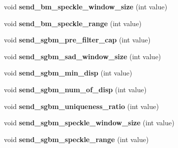 \begin{DoxyCompactItemize}
\item 
\hypertarget{classstereo_match_param_form_a77996c75fa4f772b5d4341acfdd50b09}{}void {\bfseries send\+\_\+bm\+\_\+speckle\+\_\+window\+\_\+size} (int value)\label{classstereo_match_param_form_a77996c75fa4f772b5d4341acfdd50b09}

\item 
\hypertarget{classstereo_match_param_form_a2b7c372cd0d9f42c25a44d5eaf99c2ff}{}void {\bfseries send\+\_\+bm\+\_\+speckle\+\_\+range} (int value)\label{classstereo_match_param_form_a2b7c372cd0d9f42c25a44d5eaf99c2ff}

\item 
\hypertarget{classstereo_match_param_form_acd316b30cc3066f8a32032b78ff283c7}{}void {\bfseries send\+\_\+sgbm\+\_\+pre\+\_\+filter\+\_\+cap} (int value)\label{classstereo_match_param_form_acd316b30cc3066f8a32032b78ff283c7}

\item 
\hypertarget{classstereo_match_param_form_a6492eca6d362722865ab44aaf2a155fd}{}void {\bfseries send\+\_\+sgbm\+\_\+sad\+\_\+window\+\_\+size} (int value)\label{classstereo_match_param_form_a6492eca6d362722865ab44aaf2a155fd}

\item 
\hypertarget{classstereo_match_param_form_a01a9c02e35a8e68a07fe04a13b575c14}{}void {\bfseries send\+\_\+sgbm\+\_\+min\+\_\+disp} (int value)\label{classstereo_match_param_form_a01a9c02e35a8e68a07fe04a13b575c14}

\item 
\hypertarget{classstereo_match_param_form_a15e280c258f60965a7e972e6a78f84b2}{}void {\bfseries send\+\_\+sgbm\+\_\+num\+\_\+of\+\_\+disp} (int value)\label{classstereo_match_param_form_a15e280c258f60965a7e972e6a78f84b2}

\item 
\hypertarget{classstereo_match_param_form_aed4704b886213a80bd808bc6fac40eb9}{}void {\bfseries send\+\_\+sgbm\+\_\+uniqueness\+\_\+ratio} (int value)\label{classstereo_match_param_form_aed4704b886213a80bd808bc6fac40eb9}

\item 
\hypertarget{classstereo_match_param_form_a0402267190761324594d9800c5463d41}{}void {\bfseries send\+\_\+sgbm\+\_\+speckle\+\_\+window\+\_\+size} (int value)\label{classstereo_match_param_form_a0402267190761324594d9800c5463d41}

\item 
\hypertarget{classstereo_match_param_form_a8eba0d79f01d0067aa040b3c2705fe3d}{}void {\bfseries send\+\_\+sgbm\+\_\+speckle\+\_\+range} (int value)\label{classstereo_match_param_form_a8eba0d79f01d0067aa040b3c2705fe3d}

\end{DoxyCompactItemize}
